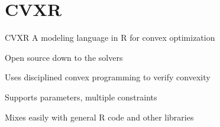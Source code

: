 \documentclass{beamer}
\begin{document}

\section{CVXR}

\begin{frame}{CVXR}
	A modeling language in R for convex optimization
	
	\BIT
		\item Open source down to the solvers
		\item Uses disciplined convex programming to verify convexity
		\item Supports parameters, multiple constraints
		\item Mixes easily with general R code and other libraries
	\EIT
\end{frame}
\end{document}
